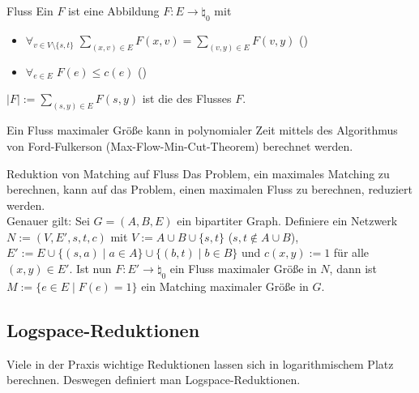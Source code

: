 \begin{Def}{Fluss}
    Ein  $F$ ist eine Abbildung $F\colon E \rightarrow \natural_0$ mit
    \begin{itemize}
        \item
        $\forall_{v \in V \setminus \{s, t\}}\;
        \sum_{(x, v) \in E} F(x, v) = \sum_{(v, y) \in E} F(v, y)$ ()

        \item
        $\forall_{e \in E}\; F(e) \le c(e)$ ()
    \end{itemize}
    $|F| := \sum_{(s, y) \in E} F(s, y)$ ist die  des Flusses $F$.
\end{Def}

\begin{Bem}
    Ein Fluss maximaler Größe kann in polynomialer Zeit mittels des
    Algorithmus von Ford-Fulkerson (Max-Flow-Min-Cut-Theorem) berechnet werden.
\end{Bem}

\linie

\begin{Satz}{Reduktion von Matching auf Fluss}
    Das Problem, ein maximales Matching zu berechnen, kann auf das Problem, einen
    maximalen Fluss zu berechnen, reduziert werden.\\
    Genauer gilt:
    Sei $G = (A, B, E)$ ein bipartiter Graph.
    Definiere ein Netzwerk $N := (V, E', s, t, c)$ mit
    $V := A \cup B \cup \{s, t\}$ ($s, t \notin A \cup B$),
    $E' := E \cup \{(s, a) \;|\; a \in A\} \cup \{(b, t) \;|\; b \in B\}$ und
    $c(x, y) := 1$ für alle $(x, y) \in E'$.
    Ist nun $F\colon E' \rightarrow \natural_0$ ein Fluss maximaler Größe in $N$,
    dann ist $M := \{e \in E \;|\; F(e) = 1\}$ ein Matching maximaler Größe in $G$.
\end{Satz}

\pagebreak

\subsection{%
    Logspace-Reduktionen%
}

\begin{Bem}
    Viele in der Praxis wichtige Reduktionen lassen sich in logarithmischem Platz berechnen.
    Deswegen definiert man Logspace-Reduktionen.
\end{Bem}

